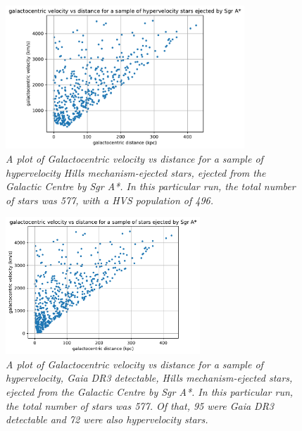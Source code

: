 \documentclass{article}
\begin{document}
\begin{figure}[h!]
\caption{\textit{A plot of Galactocentric velocity vs distance for a sample of hypervelocity Hills mechanism-ejected stars, ejected from the Galactic Centre by Sgr A*. In this particular run, the total number of stars was 577, with a HVS population of 496.}}
\centering
\includegraphics[width=0.8\textwidth]{GCv_vs_GCdist_hyp_1a.pdf}
\end{figure}

\begin{figure}[h!]
\caption{\textit{A plot of Galactocentric velocity vs distance for a sample of hypervelocity, Gaia DR3 detectable, Hills mechanism-ejected stars, ejected from the Galactic Centre by Sgr A*. In this particular run, the total number of stars was 577. Of that, 95 were Gaia DR3 detectable and 72 were also hypervelocity stars.}}
\centering
\includegraphics[width=0.65\textwidth]{GCv_vs_GCdist_1.pdf}
\end{figure}
\end{document}
